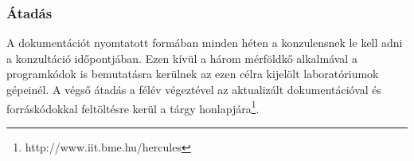     \subsubsection{Átadás}
	A dokumentációt nyomtatott formában minden héten a konzulensnek le kell adni a konzultáció időpontjában. Ezen kívül a három mérföldkő alkalmával a programkódok is bemutatásra kerülnek az ezen célra kijelölt laboratóriumok gépeinél. A végső átadás a félév végeztével az aktualizált dokumentációval és forráskódokkal feltöltésre kerül a tárgy honlapjára\footnote{http://www.iit.bme.hu/hercules}.
%
%

